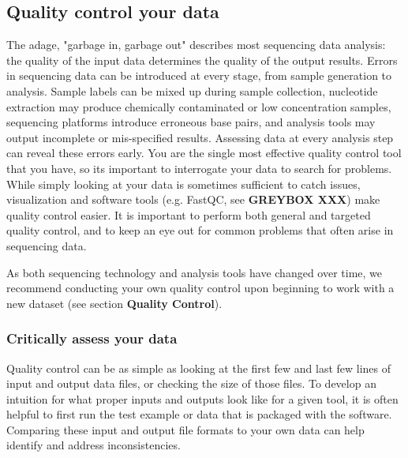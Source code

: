 \documentclass[10pt,letterpaper]{article}
\begin{document}
\subsection*{Quality control your data} %

 
The adage, "garbage in, garbage out" describes most sequencing data analysis: the quality of the input data determines the quality of the output results. 
Errors in sequencing data can be introduced at every stage, from sample generation to analysis. 
Sample labels can be mixed up during sample collection, nucleotide extraction may produce chemically contaminated or low concentration samples, sequencing platforms introduce erroneous base pairs, and analysis tools may output incomplete or mis-specified results. 
Assessing data at every analysis step can reveal these errors early. 
You are the single most effective quality control tool that you have, so its important to interrogate your data to search for problems. 
While simply looking at your data is sometimes sufficient to catch issues, visualization and software tools (e.g. FastQC, see \textbf{GREYBOX XXX}) make quality control easier. 
It is important to perform both general and targeted quality control, and to keep an eye out for common problems that often arise in sequencing data. 

As both sequencing technology and analysis tools have changed over time, we recommend conducting your own quality control upon beginning to work with a new dataset (see section \textbf{Quality  Control}).


\subsubsection*{Critically assess your data}
Quality control can be as simple as looking at the first few and last few lines of input and output data files, or checking the size of those files. 
To develop an intuition for what proper inputs and outputs look like for a given tool, it is often helpful to first run the test example or data that is packaged with the software. 
Comparing these input and output file formats to your own data can help identify and address inconsistencies. 
\end{document}
